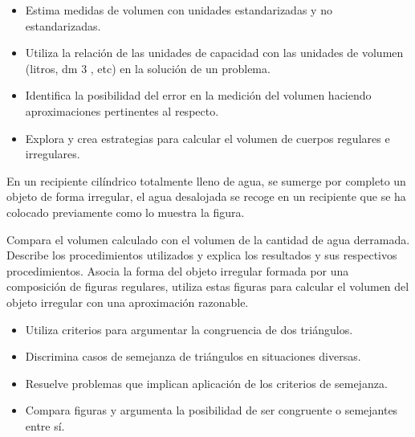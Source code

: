 \begin{itemize}
  \item Estima medidas de volumen con unidades estandarizadas y no estandarizadas.
  \item Utiliza la relación de las unidades de capacidad con las unidades de volumen (litros, dm 3 , etc) en la solución de un problema.
  \item Identifica la posibilidad del error en la medición del volumen haciendo aproximaciones pertinentes al respecto.
  \item Explora y crea estrategias para calcular el volumen de cuerpos regulares e irregulares.
\end{itemize}

\ejemplo

En un recipiente cilíndrico totalmente lleno de agua, se sumerge por completo un objeto de forma irregular, el agua desalojada se recoge en un recipiente que se ha colocado previamente como lo muestra la figura.



Compara el volumen calculado con el volumen de la cantidad de agua derramada. Describe los procedimientos utilizados y explica los resultados y sus respectivos procedimientos. Asocia la forma del objeto irregular formada por una composición de figuras regulares, utiliza estas figuras para calcular el volumen del objeto irregular con una aproximación razonable.



\evidencias

\begin{itemize}
  \item Utiliza criterios para argumentar la congruencia de dos triángulos.
  \item Discrimina casos de semejanza de triángulos en situaciones diversas.
  \item Resuelve problemas que implican aplicación de los criterios de semejanza.
  \item Compara figuras y argumenta la posibilidad de ser congruente o semejantes entre sí.
\end{itemize}

\ejemplo

